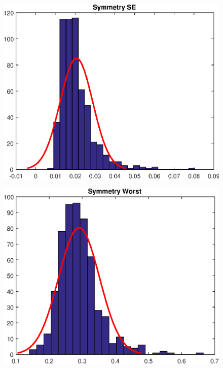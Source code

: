 \documentclass[11pt,a4paper]{article}
\numberwithin{equation}{section}
\begin{document}
\begin{itemize}
\begin{figure}[H]
\centering
\begin{minipage}{.4\textwidth}
  \centering
  \includegraphics[width=\linewidth]{./img/symmetry_se}
  \label{fig:test1}
\end{minipage}%
\begin{minipage}{.4\textwidth}
  \centering
  \includegraphics[width=\linewidth]{./img/symmetry_worst}
  \label{fig:test2}
\end{minipage}
\end{figure}



\end{itemize}
\end{document}
